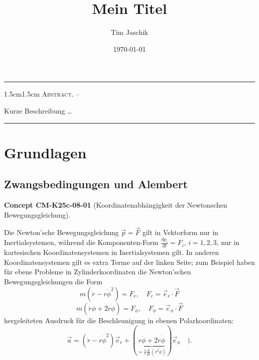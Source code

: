 \documentclass[10pt, letterpaper]{article}
\title{Mein Titel}
\author{Tim Jaschik}
\date{\today}
\renewenvironment{abstract}
  {
    \begin{adjustwidth}{1.5cm}{1.5cm}
    \small
    \textsc{Abstract. –}%
  }
  {
    \end{adjustwidth}
  }
\newcommand{\CustomHeading}[3]{%
  \par\medskip\noindent%
  \textbf{#1 #2} \textnormal{(#3)}.\enskip%
}
\newenvironment{CONC}[2]{\CustomHeading{Concept}{#1}{#2}}{}
\begin{document}
\maketitle
\rule{\textwidth}{0.5pt}
\begin{abstract}
Kurze Beschreibung …
\end{abstract}
\rule{\textwidth}{0.5pt}
\vspace{0.5cm}

\tableofcontents

\pagebreak

\section{Grundlagen}

\subsection{Zwangsbedingungen und Alembert}

\begin{CONC}{CM-K25c-08-01}{Koordinatenabhängigkeit der Newtonschen Bewegungsgleichung}
Die Newton'sche Bewegungsgleichung $\vec{p} = \vec{F}$ gilt in Vektorform nur in Inertialsystemen, während die Komponenten-Form $\frac{dp_i}{dt} = F_i$, $i=1,2,3$, nur in kartesischen Koordinatensystemen in Inertialsystemen gilt. In anderen Koordinatensystemen gilt es extra Terme auf der linken Seite; zum Beispiel haben für ebene Probleme in Zylinderkoordinaten die Newton'schen Bewegungsgleichungen die Form
\[m(\ddot{r}-r\dot{\phi}^2) = F_r, \quad F_r = \vec{e}_r \cdot \vec{F}\]
\[m(\ddot{r}\phi + 2\dot{r}\dot{\phi}) = F_{\phi}, \quad F_{\phi} = \vec{e}_{\phi} \cdot \vec{F}\]
hergeleiteten Ausdruck für die Beschleunigung in ebenen Polarkoordinaten:
\[\vec{a} = (\ddot{r}-r\dot{\phi}^2)\vec{e}_r + (\underbrace{r\ddot{\phi} + 2\dot{r}\dot{\phi}}_{=\frac{1}{r}\frac{d}{dt}(r^2\dot{\phi})})\vec{e}_{\phi} \quad).\]
\end{CONC}
\end{document}
